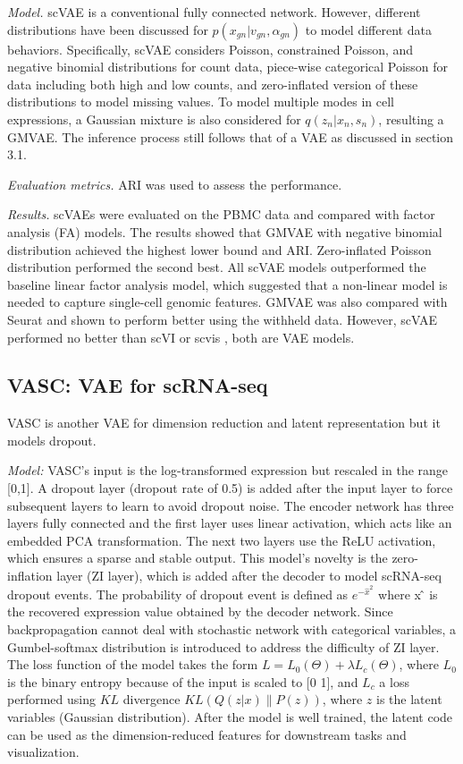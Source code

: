 \documentclass[
]{book}
\begin{document}
\emph{Model.} scVAE is a conventional fully connected network. However, different distributions have been discussed for \(p(x_{gn}\vert v_{gn},\alpha_{gn})\) to model different data behaviors. Specifically, scVAE considers Poisson, constrained Poisson, and negative binomial distributions for count data, piece-wise categorical Poisson for data including both high and low counts, and zero-inflated version of these distributions to model missing values. To model multiple modes in cell expressions, a Gaussian mixture is also considered for \(q(z_{n}\vert x_{n},s_{n})\), resulting a GMVAE. The inference process still follows that of a VAE as discussed in section 3.1.

\emph{Evaluation metrics.} ARI was used to assess the performance.

\emph{Results.} scVAEs were evaluated on the PBMC data and compared with factor analysis (FA) models. The results showed that GMVAE with negative binomial distribution achieved the highest lower bound and ARI. Zero-inflated Poisson distribution performed the second best. All scVAE models outperformed the baseline linear factor analysis model, which suggested that a non-linear model is needed to capture single-cell genomic features. GMVAE was also compared with Seurat and shown to perform better using the withheld data. However, scVAE performed no better than scVI \citep{RN88} or scvis \citep{RN127}, both are VAE models.

\hypertarget{ch-5-3-5}{%
\subsection{VASC: VAE for scRNA-seq}\label{ch-5-3-5}}

VASC \citep{RN131} is another VAE for dimension reduction and latent representation but it models dropout.

\emph{Model:} VASC's input is the log-transformed expression but rescaled in the range {[}0,1{]}. A dropout layer (dropout rate of 0.5) is added after the input layer to force subsequent layers to learn to avoid dropout noise. The encoder network has three layers fully connected and the first layer uses linear activation, which acts like an embedded PCA transformation. The next two layers use the ReLU activation, which ensures a sparse and stable output. This model's novelty is the zero-inflation layer (ZI layer), which is added after the decoder to model scRNA-seq dropout events. The probability of dropout event is defined as \(e^{-\hat{x}^{2}}\) where x ̂ is the recovered expression value obtained by the decoder network. Since backpropagation cannot deal with stochastic network with categorical variables, a Gumbel-softmax distribution \citep{RN132} is introduced to address the difficulty of ZI layer. The loss function of the model takes the form \(L = L_{0}(\Theta)+\lambda L_{c}(\Theta)\), where \(L_{0}\) is the binary entropy because of the input is scaled to {[}0 1{]}, and \(L_{c}\) a loss performed using \(KL\) divergence \(KL(Q(z\vert x)\|P(z))\), where \(z\) is the latent variables (Gaussian distribution). After the model is well trained, the latent code can be used as the dimension-reduced features for downstream tasks and visualization.
\end{document}
